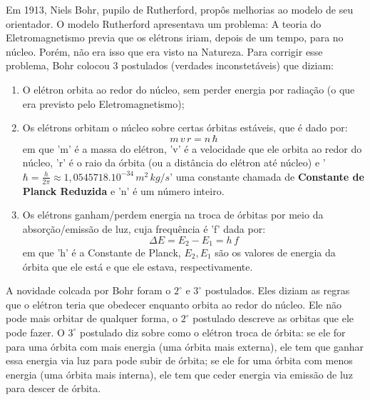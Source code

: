 \documentclass[12pt]{extarticle}
\newcommand{\<}{\langle}
\renewcommand{\>}{\rangle}
\theoremstyle{definition}
\begin{document}
Em 1913, Niels Bohr, pupilo de Rutherford, propôs melhorias ao modelo de seu orientador. O modelo Rutherford apresentava um problema: A teoria do Eletromagnetismo previa que os elétrons iriam, depois de um tempo, para no núcleo. Porém, não era isso que era visto na Natureza. Para corrigir esse problema, Bohr colocou 3 postulados (verdades inconstetáveis) que diziam:
\begin{enumerate}
    \item O elétron orbita ao redor do núcleo, sem perder energia por radiação (o que era previsto pelo Eletromagnetismo);
    \item Os elétrons orbitam o núcleo sobre certas órbitas estáveis, que é dado por:
    \begin{equation}
        m\,v\,r = n\,\hbar
    \end{equation}
    \noindent em que 'm' é a massa do elétron, 'v' é a velocidade que ele orbita ao redor do núcleo, 'r' é o raio da órbita (ou a distância do elétron até núcleo) e '$\hbar = \frac{h}{2\pi} \approx 1,0545718.10^{-34}\,m^2\,kg/s$' uma constante chamada de \textbf{Constante de Planck Reduzida} e 'n' é um número inteiro.
    \item Os elétrons ganham/perdem energia na troca de órbitas por meio da absorção/emissão de luz, cuja frequência é 'f' dada por:
    \begin{equation}
        \Delta E = E_2 - E_1 = h\,f
    \end{equation}
    \noindent em que 'h' é a Constante de Planck, $E_2,E_1$ são os valores de energia da órbita que ele está e que ele estava, respectivamente.
\end{enumerate}

A novidade colcada por Bohr foram o $2^\circ$ e $3^\circ$ postulados. Eles diziam as regras que o elétron teria que obedecer enquanto orbita ao redor do núcleo. Ele não pode mais orbitar de qualquer forma, o $2^\circ$ postulado descreve as orbitas que ele pode fazer. O $3^\circ$ postulado diz sobre como o elétron troca de órbita: se ele for para uma órbita com mais energia (uma órbita mais externa), ele tem que ganhar essa energia via luz para pode subir de órbita; se ele for uma órbita com menos energia (uma órbita mais interna), ele tem que ceder energia via emissão de luz para descer de órbita.
\end{document}

